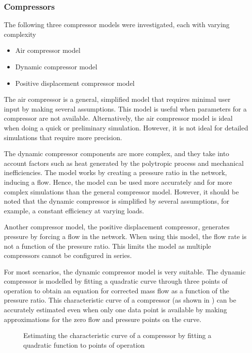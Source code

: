 		\subsubsection{Compressors}
		The following three compressor models were investigated, each with varying complexity
		\begin{itemize}
			\item Air compressor model
			\item Dynamic compressor model
			\item Positive displacement compressor model
		\end{itemize} 
		The air compressor is a general, simplified model that requires minimal user input by making several assumptions. This model is useful when parameters for a compressor are not available. Alternatively, the air compressor model is ideal when doing a quick or preliminary simulation. However, it is not ideal for detailed simulations that require more precision.
		\par 
		\clearpage
		The dynamic compressor components are more complex, and they take into account factors such as heat generated by the polytropic process and mechanical inefficiencies. The model works by creating a pressure ratio in the network, inducing a flow. Hence, the model can be used more accurately and for more complex simulations than the general compressor model. However, it should be noted that the dynamic compressor is simplified by several assumptions, for example, a constant efficiency at varying loads. 
		\par 
		Another compressor model, the positive displacement compressor, generates pressure by forcing a flow in the network. When using this model, the flow rate is not a function of the pressure ratio. This limits the model as multiple compressors cannot be configured in series.
		\par 	 
		For most scenarios, the dynamic compressor model is very suitable. The dynamic compressor is modelled by fitting a quadratic curve through three points of operation to obtain an equation for corrected mass flow as a function of the pressure ratio. This characteristic curve of a compressor (as shown in ) can be accurately estimated even when only one data point is available by making approximations for the zero flow and pressure points on the curve.
		\begin{figure}[h!]
			\centering
			\fbox{}
			\caption{Estimating the characteristic curve of a compressor by fitting a quadratic function to points of operation}
			\label{fig: Compressor Curve}
		\end{figure}
